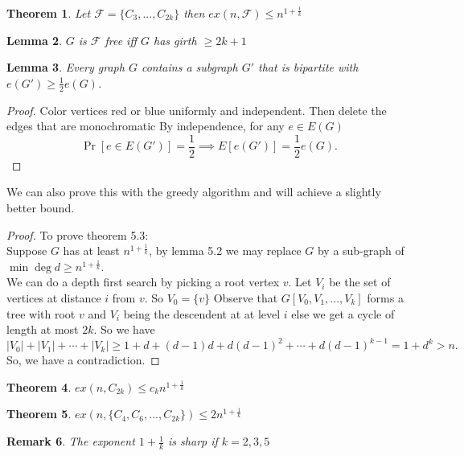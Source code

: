 \documentclass[a4paper]{article}
\newtheorem{thm}{Theorem}[section]
\newtheorem{lem}[thm]{Lemma}
\newtheorem{rmk}[thm]{Remark}
\begin{document}
\begin{thm}
    Let $\mathcal{F}= \{C_{3},...,C_{2k}\}$ then $ex(n,\mathcal{F})\leq n^{{1+\frac{1}{k}}}$
\end{thm}
\begin{lem}
    $G$ is $\mathcal{F}$ free iff $G$ has girth $\geq 2k+1$
\end{lem}
\begin{lem}
    Every graph $G$ contains a subgraph $G'$ that is bipartite with $e(G')\geq \frac{1}{2}e(G)$.
\end{lem}
\begin{proof}
        Color vertices red or blue uniformly and independent. Then delete the edges that are monochromatic By independence, for any $e\in E(G)$ \[
        \Pr[e\in E(G')]=\frac{1}{2}\implies E[e(G')]=\frac{1}{2}e(G)
        .\]
\end{proof}
\noindent We can also prove this with the greedy algorithm and will achieve a slightly better bound.
\begin{proof}
    To prove theorem 5.3:\\
    Suppose $G$ has at least $n^{1+\frac{1}{k}}$, by lemma 5.2 we may replace $G$ by a sub-graph of $\min \deg d\geq n^{1+\frac{1}{k}}$.\\ We can do a depth first search by picking a root vertex $v$. Let $V_{i}$ be the set of vertices at distance $i$ from $v$. So $V_{0}= \{ v\}$ Observe that $G[V_{0},V_{1},...,V_{k}]$ forms a tree with root $v$ and $V_{i}$ being the descendent at at level $i$ else we get a cycle of length at most $2k.$ So we have \[
    |V_{0}|+|V_{1}|+\cdots+|V_{k}|\geq 1+d+(d-1)d+d(d-1)^{2}+\cdots+d(d-1)^{k-1}=1+d^k>n
    .\] 
    So, we have a contradiction.
\end{proof}
\begin{thm}
    $ex(n,C_{2k})\leq c_kn^{1+\frac{1}{k}}$
\end{thm}
\begin{thm}
    $ex(n, \{C_4,C_6,...,C_{2k}\})\leq 2n^{1+\frac{1}{k}}$
\end{thm}
\begin{rmk}
    The exponent $1+\frac{1}{k}$ is sharp if $k=2,3,5$
\end{rmk}
\end{document}

